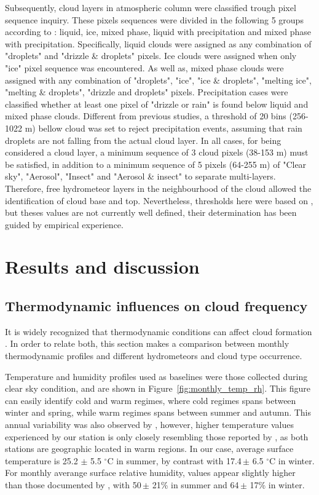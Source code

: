 \documentclass[journal abbreviation, manuscript]{copernicus}
\begin{document}
Subsequently, cloud layers in atmospheric column were classified trough pixel sequence inquiry. These pixels sequences were divided in the following 5 groups according to \citet{Pirloaga2022}: liquid, ice, mixed phase, liquid with precipitation and mixed phase with precipitation. Specifically, liquid clouds were assigned as any combination of "droplets" and "drizzle \& droplets" pixels. Ice clouds were assigned when only "ice" pixel sequence was encountered. As well as, mixed phase clouds were assigned with any combination of "droplets", "ice", "ice \& droplets", "melting ice", "melting \& droplets", "drizzle and droplets" pixels. Precipitation cases were classified whether at least one pixel of "drizzle or rain" is found below liquid and mixed phase clouds. Different from previous studies, a threshold of 20 bins (256-1022 m) bellow cloud was set to reject precipitation events, assuming that rain droplets are not falling from the actual cloud layer. In all cases, for being considered a cloud layer, a minimum sequence of 3 cloud pixels (38-153 m) \citep{Nomokonova2019} must be satisfied, in addition to a minimum sequence of 5 pixels (64-255 m) of "Clear sky", "Aerosol", "Insect" and "Aerosol \& insect" to separate multi-layers. Therefore, free hydrometeor layers in the neighbourhood of the cloud allowed the identification of cloud base and top. Nevertheless, thresholds here were based on \citet{Pirloaga2022,Nomokonova2019}, but theses values are not currently well defined, their determination has been guided by empirical experience.

\section{Results and discussion}

\subsection{Thermodynamic influences on cloud frequency}

It is widely recognized that thermodynamic conditions can affect cloud formation \citep{XXX}. In order to relate both, this section makes a comparison between monthly thermodynamic profiles and different hydrometeors and cloud type occurrence.

Temperature and humidity profiles used as baselines were those collected during clear sky condition, and are shown in Figure~\ref{fig:monthly_temp_rh}. This figure can easily identify cold and warm regimes, where cold regimes spans between winter and spring, while warm regimes spans between summer and autumn. This annual variability was also observed by \citet{Pirloaga2022,Nomokonova2019}, however, higher temperature values experienced by our station is only closely resembling those reported by \citet{Pirloaga2022}, as both stations are geographic located in warm regions. In our case, average surface temperature is 25.2 $\pm$ 5.5 $^{\circ}$C in summer, by contrast with 17.4\,$\pm$ 6.5 $^{\circ}$C in winter. For monthly averange surface relative humidity, values appear slightly higher than those documented by \citet{Nomokonova2019}, with 50\,$\pm$ 21\% in summer and 64\,$\pm$ 17\%  in winter.
\end{document}
